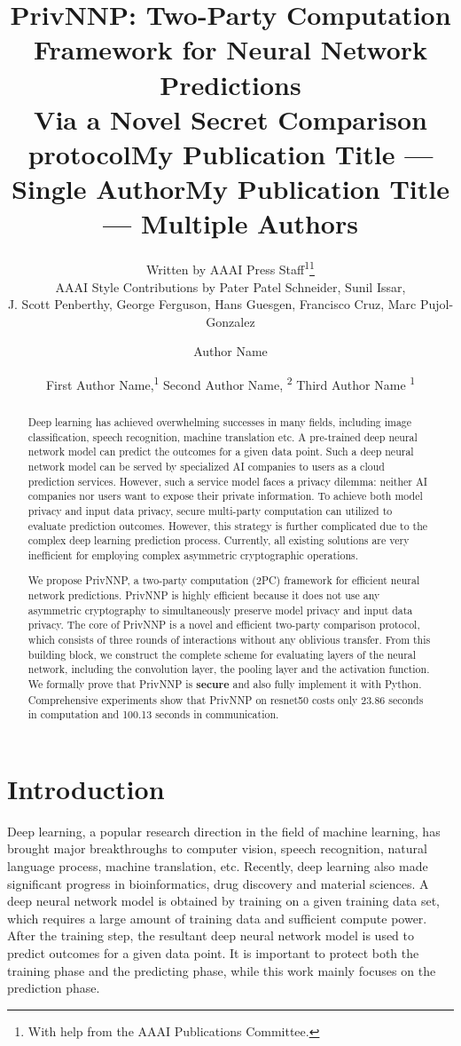 \documentclass[letterpaper]{article} %
\title{PrivNNP: Two-Party Computation Framework for Neural Network Predictions \\ Via a Novel Secret Comparison protocol}
\author{
    Written by AAAI Press Staff\textsuperscript{\rm 1}\thanks{With help from the AAAI Publications Committee.}\\
    AAAI Style Contributions by Pater Patel Schneider,
    Sunil Issar,\\
    J. Scott Penberthy,
    George Ferguson,
    Hans Guesgen,
    Francisco Cruz\equalcontrib,
    Marc Pujol-Gonzalez\equalcontrib
}
\title{My Publication Title --- Single Author}
\author {
    Author Name
}
\title{My Publication Title --- Multiple Authors}
\author {
    First Author Name,\textsuperscript{\rm 1}
    Second Author Name, \textsuperscript{\rm 2}
    Third Author Name \textsuperscript{\rm 1}
}
\begin{document}
\maketitle

\begin{abstract}

    Deep learning has achieved overwhelming successes in many fields, including image classification, speech recognition, machine translation etc.
    A pre-trained deep neural network model can predict the outcomes
    for a given data point. Such a deep neural network model can be served by
    specialized AI companies to users as a cloud prediction services.
    However, such a service model faces a privacy dilemma: neither AI companies nor
    users want to expose their private information.
    To achieve both model privacy and input data privacy,
    secure multi-party computation can utilized to evaluate prediction outcomes. However,
    this strategy is further complicated due to the complex deep learning prediction process.
    Currently, all existing solutions are very inefficient for employing complex asymmetric cryptographic operations.

    We propose PrivNNP, a two-party computation (2PC) framework for efficient neural network predictions.
    PrivNNP is highly efficient because it does not use any asymmetric cryptography to simultaneously preserve model privacy and input data privacy.
    The core of PrivNNP is a novel and efficient two-party comparison protocol,
    which consists of three rounds of interactions without any oblivious transfer.
    From this building block, we construct the complete scheme for evaluating layers of the neural network, including the convolution layer, the pooling layer and the activation function.
	We formally prove that PrivNNP is {\bf secure} and also fully implement it with Python.
    Comprehensive experiments show that PrivNNP on resnet50
    costs only 23.86 seconds in computation and 100.13 seconds in communication.


\end{abstract}


\section{Introduction}



    \noindent Deep learning, a popular research direction in the field of machine learning,
    has brought major breakthroughs to computer vision, speech recognition, natural language process, machine translation, etc. Recently,
    deep learning also made significant progress in bioinformatics, drug discovery and material sciences.
    A deep neural network model is obtained by training on
	a given training data set, which requires a large amount of training data and sufficient compute power.
	After the training step, the resultant deep neural network model is used to predict
	outcomes for a given data point. It is important to protect both the training phase and the predicting phase,
    while this work mainly focuses on the prediction phase.
\end{document}
